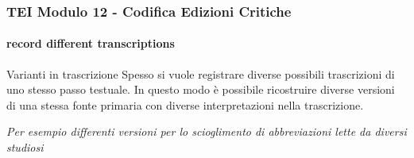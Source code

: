 \begin{frame}
    \frametitle{TEI Modulo 12 - Codifica Edizioni Critiche}
    \framesubtitle{record different transcriptions}
    \addtocounter{nframe}{1}
    







    \begin{block}{Varianti in trascrizione}
       Spesso si vuole registrare diverse possibili trascrizioni di uno stesso passo testuale. In questo modo è possibile ricostruire diverse versioni di una stessa fonte primaria con diverse interpretazioni nella trascrizione.
    \end{block}
    \textit{Per esempio differenti versioni per lo scioglimento di abbreviazioni lette da diversi studiosi}

\end{frame}


